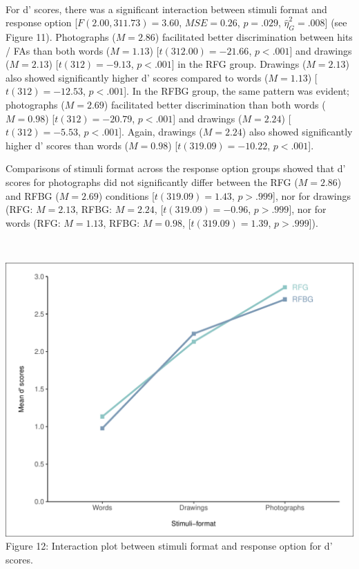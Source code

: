 \documentclass[
  11pt,
]{article}
\begin{document}
~

For d' scores, there was a significant interaction between stimuli
format and response option {[}\(F(2.00, 311.73) = 3.60\),
\(\mathit{MSE} = 0.26\), \(p = .029\), \(\hat{\eta}^2_G = .008\){]} (see
Figure 11). Photographs (\(M = 2.86\)) facilitated better discrimination
between hits / FAs than both words (\(M = 1.13\))
{[}\(t(312.00) = -21.66\), \(p < .001\){]} and drawings (\(M = 2.13\))
{[}\(t(312) = -9.13\), \(p < .001\){]} in the RFG group. Drawings
(\(M = 2.13\)) also showed significantly higher d' scores compared to
words (\(M = 1.13\)) {[}\(t(312) = -12.53\), \(p < .001\){]}. In the
RFBG group, the same pattern was evident; photographs (\(M = 2.69\))
facilitated better discrimination than both words (\(M = 0.98\))
{[}\(t(312) = -20.79\), \(p < .001\){]} and drawings (\(M = 2.24\))
{[}\(t(312) = -5.53\), \(p < .001\){]}. Again, drawings (\(M = 2.24\))
also showed significantly higher d' scores than words (\(M = 0.98\))
{[}\(t(319.09) = -10.22\), \(p < .001\){]}.

Comparisons of stimuli format across the response option groups showed
that d' scores for photographs did not significantly differ between the
RFG (\(M = 2.86\)) and RFBG (\(M = 2.69\)) conditions
{[}\(t(319.09) = 1.43\), \(p > .999\){]}, nor for drawings (RFG:
\(M = 2.13\), RFBG: \(M = 2.24\), {[}\(t(319.09) = -0.96\),
\(p > .999\){]}, nor for words (RFG: \(M = 1.13\), RFBG: \(M = 0.98\),
{[}\(t(319.09) = 1.39\), \(p > .999\){]}).

~

\includegraphics{R--Thesis_files/figure-latex/unnamed-chunk-35-1.pdf}
Figure 12: Interaction plot between stimuli format and response option
for d' scores.
\end{document}
